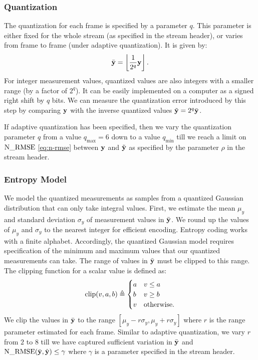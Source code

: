 \subsubsection{Quantization}
The quantization for each frame is specified by a parameter $q$.
This parameter is either fixed for the whole stream
(as specified in the stream header),
or varies from frame to frame (under adaptive quantization).
It is given by:
\begin{equation}
\bar{\mathbf{y}} = \left \lfloor \frac{1}{2^q} \mathbf{y} \right \rfloor.
\end{equation}
For integer measurement values, quantized values are also
integers with a smaller range (by a factor of $2^q$).
It can be easily implemented on a computer as a signed
right shift by $q$ bits.
We can measure the quantization error introduced by
this step by comparing $\mathbf{y}$ with the inverse quantized values
$\tilde{\mathbf{y}} = 2^q \bar{\mathbf{y}}$.

If adaptive quantization has been specified, then we vary
the quantization parameter $q$ from a value $q_{\max}=6$
down to a value $q_{\min}$
till we reach a limit on $\mathrm{N\_RMSE}$ \eqref{eq:n-rmse} between $\mathbf{y}$ and $\tilde{\mathbf{y}}$
as specified by the parameter $\rho$ in the stream header.

\subsubsection{Entropy Model}
We model the quantized measurements as samples from
a quantized Gaussian distribution that can only take integral values.
First, we estimate the mean $\mu_y$ and standard deviation $\sigma_y$
of measurement values in $\bar{\mathbf{y}}$.
We round up the values of $\mu_y$ and $\sigma_y$ to the nearest integer
for efficient encoding.
Entropy coding works with a finite alphabet.
Accordingly, the quantized Gaussian model
requires specification of the minimum
and maximum values that our quantized
measurements can take.
The range of values in $\bar{\mathbf{y}}$ must be clipped to this range.
The clipping function for a scalar value is defined as:
\begin{equation}
\mathrm{clip} (v, a, b) \triangleq \begin{cases}
a & v \leq a \\
b & v \geq b \\
v & \text{otherwise}.
\end{cases}
\end{equation}
We clip the values in $\bar{\mathbf{y}}$ to the range
$[\mu_y - r \sigma_y, \mu_y + r \sigma_y]$
where $r$ is the range parameter estimated for each frame.
Similar to adaptive quantization, we vary $r$ from $2$ to $8$
till we have captured sufficient variation in $\bar{\mathbf{y}}$
and $\mathrm{N\_RMSE}(\bar{\mathbf{y}}, \hat{\mathbf{y}}) \leq \gamma$
where $\gamma$ is a parameter specified in the stream header.


